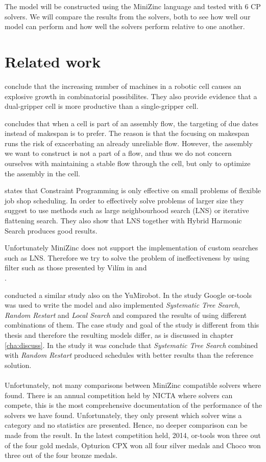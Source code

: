 The model will be constructed using the MiniZinc language and tested with 6 CP solvers. We will compare the results from the solvers, both to see how well our model can perform and how well the solvers perform relative to one another.

\section{Related work}
\cite{sethi_2006} conclude that the increasing number of machines in a robotic cell causes an explosive growth in combinatorial possibilites. They also provide evidence that a dual-gripper cell is more productive than a single-gripper cell.

\cite{thornblad_2013} concludes that when a cell is part of an assembly flow, the targeting of due dates instead of makespan is to prefer. The reason is that the focusing on makespan runs the risk of exacerbating an already unreliable flow. However, the assembly we want to construct is not a part of a flow, and thus we do not concern ourselves with maintaining a stable flow through the cell, but only to optimize the assembly in the cell.

\cite{yuan_2013} states that Constraint Programming is only effective on small problems of flexible job shop scheduling. In order to effectively solve problems of larger size they suggest to use methods such as large neighbourhood search (LNS) or iterative flattening search. They also show that LNS together with Hybrid Harmonic Search produces good results.

Unfortunately MiniZinc does not support the implementation of custom searches such as LNS. Therefore we try to solve the problem of ineffectiveness by using filter such as those presented by Vilím in \cite{VilimBartak2002Batch} \cite{Vilim2002Precedence} and \\\cite{VilimBartak2002Sequence}.

\cite{ejenstam_2014} conducted a similar study also on the YuMi\textsuperscript\textregistered robot. In the study Google or-tools was used to write the model and also implemented \emph{Systematic Tree Search}, \emph{Random Restart} and \emph{Local Search} and compared the results of using different combinations of them. The case study and goal of the study is different from this thesis and therefore the resulting models differ, as is discussed in chapter \ref{cha:discuss}. In the study it was conclude that \emph{Systematic Tree Search} combined with \emph{Random Restart} produced schedules with better results than the reference solution.
\\\\
Unfortunately, not many comparisons between MiniZinc compatible solvers where found. There is an annual competition held by NICTA where solvers can compete, this is the most comprehensive documentation of the performance of the solvers we have found. Unfortunately, they only present which solver wins a category and no statistics are presented. Hence, no deeper comparison can be made from the result. In the latest competition held, 2014, or-tools won three out of the four gold medals, Opturion CPX won all four silver medals and Choco won three out of the four bronze medals\cite{mz_result_2014}.

